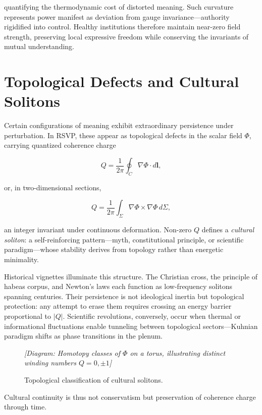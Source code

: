 \documentclass[12pt,a4paper]{article}
\begin{document}
quantifying the thermodynamic cost of distorted meaning. Such curvature represents power manifest as deviation from gauge invariance—authority rigidified into control. Healthy institutions therefore maintain near-zero field strength, preserving local expressive freedom while conserving the invariants of mutual understanding.

\section{Topological Defects and Cultural Solitons}

Certain configurations of meaning exhibit extraordinary persistence under perturbation. In RSVP, these appear as topological defects in the scalar field $\Phi$, carrying quantized coherence charge

\begin{equation}
Q = \frac{1}{2\pi} \oint_C \nabla \Phi \cdot d\mathbf{l},
\end{equation}

or, in two-dimensional sections,

\begin{equation}
Q = \frac{1}{2\pi} \int_{\Sigma} \nabla \Phi \times \nabla \Phi \, d\Sigma,
\end{equation}

an integer invariant under continuous deformation. Non-zero $Q$ defines a \emph{cultural soliton}: a self-reinforcing pattern—myth, constitutional principle, or scientific paradigm—whose stability derives from topology rather than energetic minimality.

Historical vignettes illuminate this structure. The Christian cross, the principle of habeas corpus, and Newton’s laws each function as low-frequency solitons spanning centuries. Their persistence is not ideological inertia but topological protection: any attempt to erase them requires crossing an energy barrier proportional to $|Q|$. Scientific revolutions, conversely, occur when thermal or informational fluctuations enable tunneling between topological sectors—Kuhnian paradigm shifts as phase transitions in the plenum.

\begin{figure}[h]
\centering
\textit{[Diagram: Homotopy classes of $\Phi$ on a torus, illustrating distinct winding numbers $Q = 0, \pm 1$]}
\caption{Topological classification of cultural solitons.}
\end{figure}

Cultural continuity is thus not conservatism but preservation of coherence charge through time.
\end{document}
